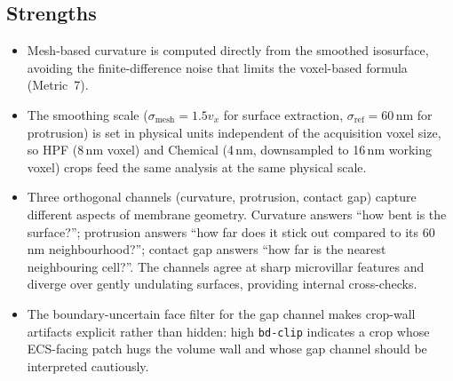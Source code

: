 \subsection*{Strengths}
\begin{itemize}[nosep]
\item Mesh-based curvature is computed directly from the smoothed
isosurface, avoiding the finite-difference noise that limits the
voxel-based formula (Metric~7).
\item The smoothing scale ($\sigma_\text{mesh} = 1.5 v_x$ for surface
extraction, $\sigma_\text{ref} = 60$\,nm for protrusion) is set in
physical units independent of the acquisition voxel size, so HPF
(8\,nm voxel) and Chemical (4\,nm, downsampled to 16\,nm working voxel)
crops feed the same analysis at the same physical scale.
\item Three orthogonal channels (curvature, protrusion, contact gap)
capture different aspects of membrane geometry. Curvature answers
``how bent is the surface?''; protrusion answers ``how far does it
stick out compared to its 60\,nm neighbourhood?''; contact gap
answers ``how far is the nearest neighbouring cell?''. The channels
agree at sharp microvillar features and diverge over gently
undulating surfaces, providing internal cross-checks.
\item The boundary-uncertain face filter for the gap channel makes
crop-wall artifacts explicit rather than hidden: high
\texttt{bd-clip} indicates a crop whose ECS-facing patch hugs the
volume wall and whose gap channel should be interpreted cautiously.
\end{itemize}

